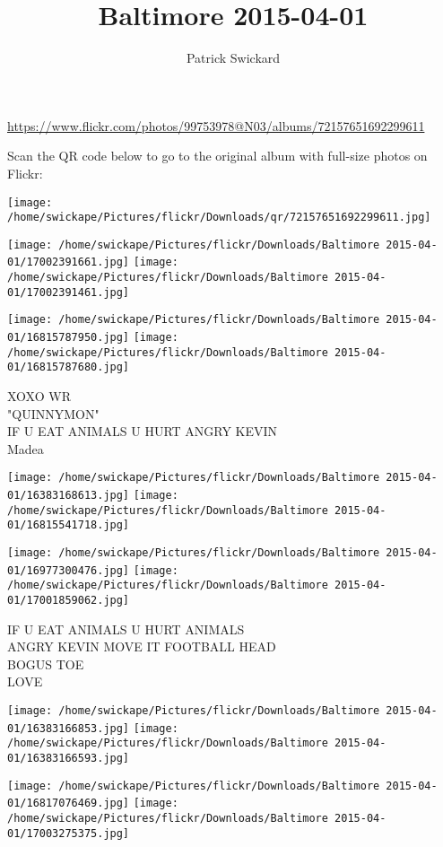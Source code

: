 \documentclass[10pt,letterpaper]{article}
\title{Baltimore 2015-04-01}
\author{Patrick Swickard}
\date{}
\begin{document}
\maketitle

\url{https://www.flickr.com/photos/99753978@N03/albums/72157651692299611}

Scan the QR code below to go to the original album with full-size photos on Flickr:

\texttt{[image: /home/swickape/Pictures/flickr/Downloads/qr/72157651692299611.jpg]}
\pagebreak

\texttt{[image: /home/swickape/Pictures/flickr/Downloads/Baltimore 2015-04-01/17002391661.jpg]}
\texttt{[image: /home/swickape/Pictures/flickr/Downloads/Baltimore 2015-04-01/17002391461.jpg]}

\texttt{[image: /home/swickape/Pictures/flickr/Downloads/Baltimore 2015-04-01/16815787950.jpg]}
\texttt{[image: /home/swickape/Pictures/flickr/Downloads/Baltimore 2015-04-01/16815787680.jpg]}

XOXO WR\\
"QUINNYMON"\\
IF U EAT ANIMALS U HURT ANGRY KEVIN\\
Madea
\pagebreak

\texttt{[image: /home/swickape/Pictures/flickr/Downloads/Baltimore 2015-04-01/16383168613.jpg]}
\texttt{[image: /home/swickape/Pictures/flickr/Downloads/Baltimore 2015-04-01/16815541718.jpg]}

\texttt{[image: /home/swickape/Pictures/flickr/Downloads/Baltimore 2015-04-01/16977300476.jpg]}
\texttt{[image: /home/swickape/Pictures/flickr/Downloads/Baltimore 2015-04-01/17001859062.jpg]}

IF U EAT ANIMALS U HURT ANIMALS\\
ANGRY KEVIN MOVE IT FOOTBALL HEAD\\
BOGUS TOE\\
LOVE
\pagebreak

\texttt{[image: /home/swickape/Pictures/flickr/Downloads/Baltimore 2015-04-01/16383166853.jpg]}
\texttt{[image: /home/swickape/Pictures/flickr/Downloads/Baltimore 2015-04-01/16383166593.jpg]}

\texttt{[image: /home/swickape/Pictures/flickr/Downloads/Baltimore 2015-04-01/16817076469.jpg]}
\texttt{[image: /home/swickape/Pictures/flickr/Downloads/Baltimore 2015-04-01/17003275375.jpg]}
\end{document}
